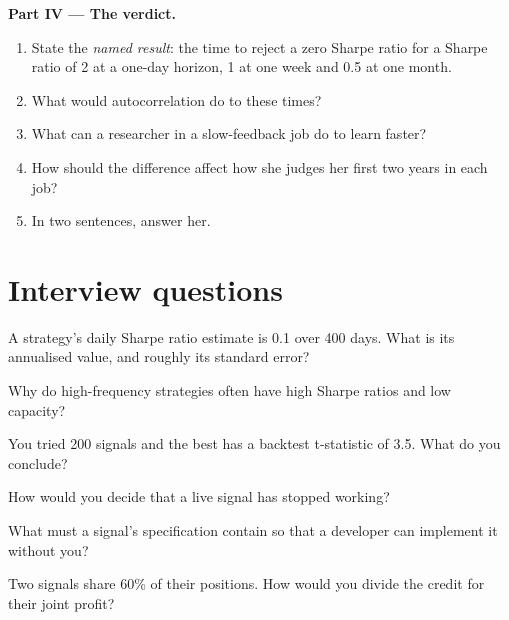\begin{problem}
\medskip\noindent\textbf{Part IV --- The verdict.}
\begin{enumerate}[resume]
\item State the \emph{named result}: the time to reject a zero Sharpe ratio for a Sharpe ratio of 2 at a one-day horizon,
1 at one week and 0.5 at one month.
\item What would autocorrelation do to these times?
\item What can a researcher in a slow-feedback job do to learn faster?
\item How should the difference affect how she judges her first two years in each job?
\item In two sentences, answer her.
\end{enumerate}
\end{problem}

\section{Interview questions}

\begin{interviewq}\label{iq:in:quant-researcher:1}
A strategy's daily Sharpe ratio estimate is 0.1 over 400 days. What is its annualised value, and roughly its standard error?
\end{interviewq}

\begin{interviewq}\label{iq:in:quant-researcher:2}
Why do high-frequency strategies often have high Sharpe ratios and low capacity?
\end{interviewq}

\begin{interviewq}\label{iq:in:quant-researcher:3}
You tried 200 signals and the best has a backtest t-statistic of 3.5. What do you conclude?
\end{interviewq}

\begin{interviewq}\label{iq:in:quant-researcher:4}
How would you decide that a live signal has stopped working?
\end{interviewq}

\begin{interviewq}\label{iq:in:quant-researcher:5}
What must a signal's specification contain so that a developer can implement it without you?
\end{interviewq}

\begin{interviewq}\label{iq:in:quant-researcher:6}
Two signals share 60\% of their positions. How would you divide the credit for their joint profit?
\end{interviewq}
